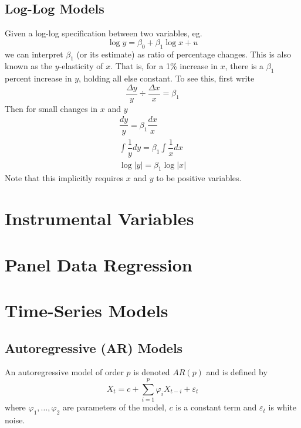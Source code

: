 \documentclass[11pt]{report} %
\begin{document}
\subsection{Log-Log Models}

Given a log-log specification between two variables, eg.
\begin{equation}
\log y = \beta_{0} + \beta_{1}\log x + u
\end{equation}
we can interpret $\beta_{1}$ (or its estimate) as ratio of percentage changes. This is also known as the $y$-elasticity of $x$. That is, for a 1\% increase in $x$, there is a $\beta_{1}$ percent increase in $y$, holding all else constant. To see this, first write
\begin{equation}
\dfrac{\Delta y}{y} \div \dfrac{\Delta x}{x} = \beta_{1} 
\end{equation}
Then for small changes in $x$ and $y$
\begin{gather}
\dfrac{dy}{y} = \beta_{1}\dfrac{dx}{x} \\
\int\dfrac{1}{y}dy = \beta_{1}\int\dfrac{1}{x}dx \\
\log\left|y\right| = \beta_{1}\log\left|x\right|
\end{gather}
Note that this implicitly requires $x$ and $y$ to be positive variables.

\section{Instrumental Variables}

\section{Panel Data Regression}

\section{Time-Series Models}

\subsection{Autoregressive (AR) Models}
An autoregressive model of order $p$ is denoted $AR\left(p\right)$ and is defined by
\begin{equation}
X_{t} = c + \sum_{i = 1}^{p}\varphi_{i}X_{t - i} + \varepsilon_{t}
\end{equation}
where $\varphi_{1}, \dots, \varphi_{2}$ are parameters of the model, $c$ is a constant term and $\varepsilon_{t}$ is white noise.
\end{document}
